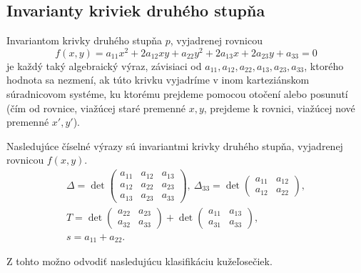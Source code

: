 \subsection{Invarianty kriviek druhého stupňa}
\begin{definition}
Invariantom krivky druhého stupňa $p$, vyjadrenej rovnicou
$$
f(x, y) = a_{11}x^2 + 2a_{12}xy + a_{22}y^2 + 2a_{13}x + 2a_{23}y + a_{33} = 0
$$
je každý taký algebraický výraz, závisiaci od \(a_{11}, a_{12}, a_{22}, a_{13}, a_{23}, a_{33}\), ktorého hodnota sa nezmení, ak túto krivku vyjadríme v inom karteziánskom súradnicovom systéme, ku ktorému prejdeme pomocou otočení alebo posunutí (čím od rovnice, viažúcej staré premenné \(x, y\), prejdeme k rovnici, viažúcej nové premenné \(x', y'\)).
\end{definition}

\begin{theorem}
Nasledujúce číselné výrazy sú invariantmi krivky druhého stupňa, vyjadrenej rovnicou $f(x, y)$.
\begin{align*}
\Delta = \det \begin{pmatrix} 
a_{11} & a_{12} & a_{13} \\ 
a_{12} & a_{22} & a_{23} \\
a_{13} & a_{23} & a_{33} \end{pmatrix}, \
\Delta_{33} = \det \begin{pmatrix} a_{11} & a_{12} \\ a_{12} & a_{22} \end{pmatrix}, \\
T = \det \begin{pmatrix} 
a_{22} & a_{23} \\
a_{32} & a_{33}  \end{pmatrix} + \det \begin{pmatrix} 
a_{11} & a_{13} \\ 
a_{31} & a_{33} \end{pmatrix}, \\
s = a_{11} + a_{22}.
\end{align*}
\end{theorem}
Z tohto možno odvodiť nasledujúcu klasifikáciu kužeľosečiek.

